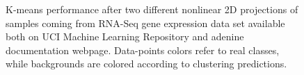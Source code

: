 \documentclass[twoside,11pt]{article}
\makeatletter
\newcommand{\ade}{{\sc adenine}\@\xspace}
\makeatother
\begin{document}
\begin{figure}[]
    \centering
    \hfill%
\caption{\small K-means performance after two different nonlinear 2D projections of samples coming from RNA-Seq gene expression data set available both on UCI Machine Learning Repository and \ade documentation webpage. Data-points colors refer to real classes, while backgrounds are colored according to clustering predictions.}\label{fig:scatter}
\end{figure}



\newpage

\end{document}
